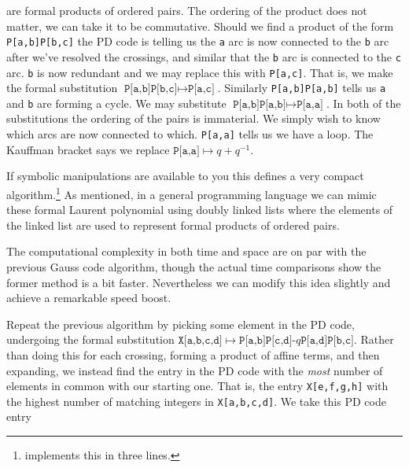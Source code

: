         are formal products of ordered pairs. The ordering of the product
        does not matter, we can take it to be commutative. Should we find a
        product of the form \texttt{P[a,b]P[b,c]} the PD code is telling us
        the \texttt{a} arc is now connected to the \texttt{b} arc after we've
        resolved the crossings, and similar that the \texttt{b} arc is
        connected to the \texttt{c} arc. \texttt{b} is now redundant and we
        may replace this with \texttt{P[a,c]}. That is, we make the formal
        substitution $\texttt{P[a,b]P[b,c]}\mapsto\texttt{P[a,c]}$. Similarly
        \texttt{P[a,b]P[a,b]} tells us \texttt{a} and \texttt{b} are forming a
        cycle. We may substitute $\texttt{P[a,b]P[a,b]}\mapsto\texttt{P[a,a]}$.
        In both of the substitutions the ordering of the pairs is immaterial.
        We simply wish to know which arcs are now connected to which.
        \texttt{P[a,a]} tells us we have a loop. The Kauffman bracket says
        we replace $\texttt{P[a,a]}\mapsto{q}+q^{-1}$.
        \par\hfill\par
        If symbolic manipulations are available to you this defines a very
        compact algorithm.\footnote{%
            \cite{KatlasJones} implements this in three lines.
        }
        As mentioned, in a general programming language we can mimic these
        formal Laurent polynomial using doubly linked lists where the elements
        of the linked list are used to represent formal products of ordered
        pairs.
        \par\hfill\par
        The computational complexity in both time and space are on par with the
        previous Gauss code algorithm, though the actual time comparisons show
        the former method is a bit faster. Nevertheless we can modify this
        idea slightly and achieve a remarkable speed boost.
        \par\hfill\par
        Repeat the previous algorithm by picking some element in the PD code,
        undergoing the formal substitution
        $\texttt{X[a,b,c,d]}\mapsto\texttt{P[a,b]P[c,d]-$q$P[a,d]P[b,c]}$.
        Rather than doing this for each crossing,
        forming a product of affine terms,
        and then expanding, we instead find the entry in the PD code with the
        \textit{most} number of elements in common with our starting one.
        That is, the entry \texttt{X[e,f,g,h]} with the highest number of
        matching integers in \texttt{X[a,b,c,d]}. We take this PD code entry
